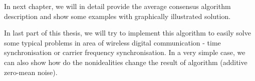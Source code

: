 In next chapter, we will in detail provide the average consensus algorithm description and show some examples with graphically illustrated solution. 

In last part of this thesis, we will try to implement this algorithm to easily solve some typical problems in area of wireless digital communication - time synchronisation or carrier frequency synchronisation. In a very simple case, we can also show how do the nonidealities change the result of algorithm (additive zero-mean noise).





